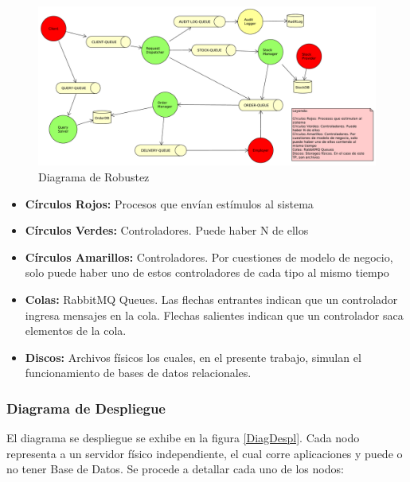 \documentclass[a4paper,10pt]{article}
\begin{document}
        \begin{figure}[!htb]                                             
            \centering                                                   
            \includegraphics[width=20cm,angle=90,origin=c]{Imagenes/robustez.pdf}        
            \caption{Diagrama de Robustez} \label{DiagRobustez}
        \end{figure}

        \begin{itemize}
            \item \textbf{Círculos Rojos:} Procesos que envían estímulos al 
            sistema
            \item \textbf{Círculos Verdes:} Controladores. Puede haber N 
            de ellos          
            \item \textbf{Círculos Amarillos:} Controladores. Por cuestiones
            de modelo de negocio, solo puede haber uno de estos controladores
            de cada tipo al mismo tiempo
            \item \textbf{Colas:} RabbitMQ Queues. Las flechas entrantes        
            indican que un controlador ingresa mensajes en la cola. Flechas
            salientes indican que un controlador saca elementos de la cola.
            \item \textbf{Discos:} Archivos físicos los cuales, en el presente
            trabajo, simulan el funcionamiento de bases de datos relacionales.
        \end{itemize}

        \subsubsection{Diagrama de Despliegue}
        El diagrama se despliegue se exhibe en la figura \ref{DiagDespl}. Cada 
        nodo representa a un servidor físico independiente, el cual corre 
        aplicaciones y puede o no tener Base de Datos. Se procede a detallar
        cada uno de los nodos:
\end{document}
